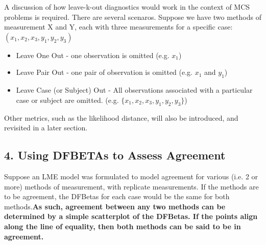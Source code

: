 \documentclass[Main.tex]{subfiles}
\begin{document}
A discussion of how leave-k-out diagnostics would work in the context of MCS problems is required. There are several scenaros. Suppose we have two methods of measurement X and Y, each with three measurements for a specific case: $(x_1,x_2,x_3,y_1,y_2,y_3)$

\begin{itemize}
\item Leave One Out - one observation is omitted (e.g. $x_1$)
\item Leave Pair Out - one pair of observation  is omitted (e.g. $x_1$ and $y_1$)
\item Leave Case (or Subject) Out - All observations associated with a particular case or subject are omitted. (e.g. $\{x_1,x_2,x_3,y_1,y_2,y_3\}$)
\end{itemize}
Other metrics, such as the likelihood distance, will also be introduced, and revisited in a later section.
\newpage
\subsection*{4. Using DFBETAs to Assess Agreement}
Suppose an LME model was formulated to model agreement for various (i.e. 2 or more) methods of measurement, with replicate measurements. If the methods are to be agreement, the DFBetas for each case would be the same for both methods.\textbf{As such, agreement between any two methods can be determined by a simple scatterplot of the DFBetas. If the points align along the line of equality, then both methods can be said to be in agreement.}
\end{document}
